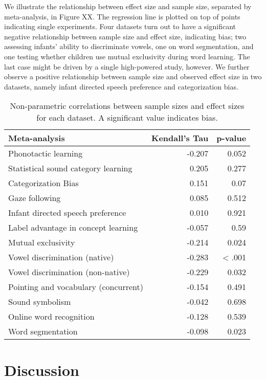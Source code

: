 \documentclass[english,floatsintext,man]{apa6}
\begin{document}
We illustrate the relationship between effect size and sample size,
separated by meta-analysis, in Figure XX. The regression line is plotted
on top of points indicating single experiments. Four datasets turn out
to have a significant negative relationship between sample size and
effect size, indicating bias; two assessing infants' ability to
discriminate vowels, one on word segmentation, and one testing whether
children use mutual exclusivity during word learning. The last case
might be driven by a single high-powered study, however. We further
observe a positive relationship between sample size and observed effect
size in two datasets, namely infant directed speech preference and
categorization bias.

\begin{table}[tbp]
\begin{center}
\begin{threeparttable}
\caption{Non-parametric correlations between sample sizes and effect sizes for each dataset. A significant value indicates bias.}
\begin{tabular}{lrr}
\toprule
Meta-analysis & Kendall's Tau & p-value\\
\midrule
Phonotactic learning & -0.207 & 0.052\\
Statistical sound category learning & 0.205 & 0.277\\
Categorization Bias & 0.151 & 0.07\\
Gaze following & 0.085 & 0.512\\
Infant directed speech preference & 0.010 & 0.921\\
Label advantage in concept learning & -0.057 & 0.59\\
Mutual exclusivity & -0.214 & 0.024\\
Vowel discrimination (native) & -0.283 & < .001\\
Vowel discrimination (non-native) & -0.229 & 0.032\\
Pointing and vocabulary (concurrent) & -0.154 & 0.491\\
Sound symbolism & -0.042 & 0.698\\
Online word recognition & -0.128 & 0.539\\
Word segmentation & -0.098 & 0.023\\
\bottomrule
\end{tabular}
\end{threeparttable}
\end{center}
\end{table}

\section{Discussion}\label{discussion}
\end{document}
